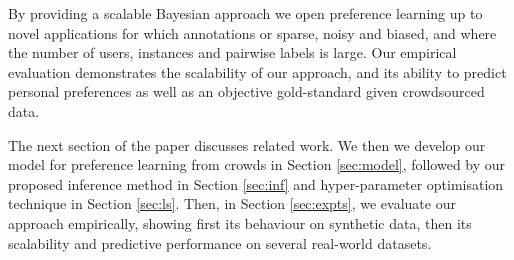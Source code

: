 By providing a scalable Bayesian approach we open preference learning up to novel applications
for which annotations or sparse, noisy and biased, and where the number of users, instances and pairwise labels is large.
Our empirical evaluation demonstrates the scalability of our approach,
and its ability to predict personal preferences as well as an objective gold-standard given crowdsourced data.

The next section of the paper discusses related work.
We then we develop our model for preference learning from crowds in Section \ref{sec:model},
followed by our proposed inference method in Section \ref{sec:inf} and
hyper-parameter optimisation technique in Section \ref{sec:ls}.
Then, in Section \ref{sec:expts}, 
we evaluate our approach empirically, showing first its behaviour on synthetic data, 
then its scalability and predictive performance on several real-world datasets.
